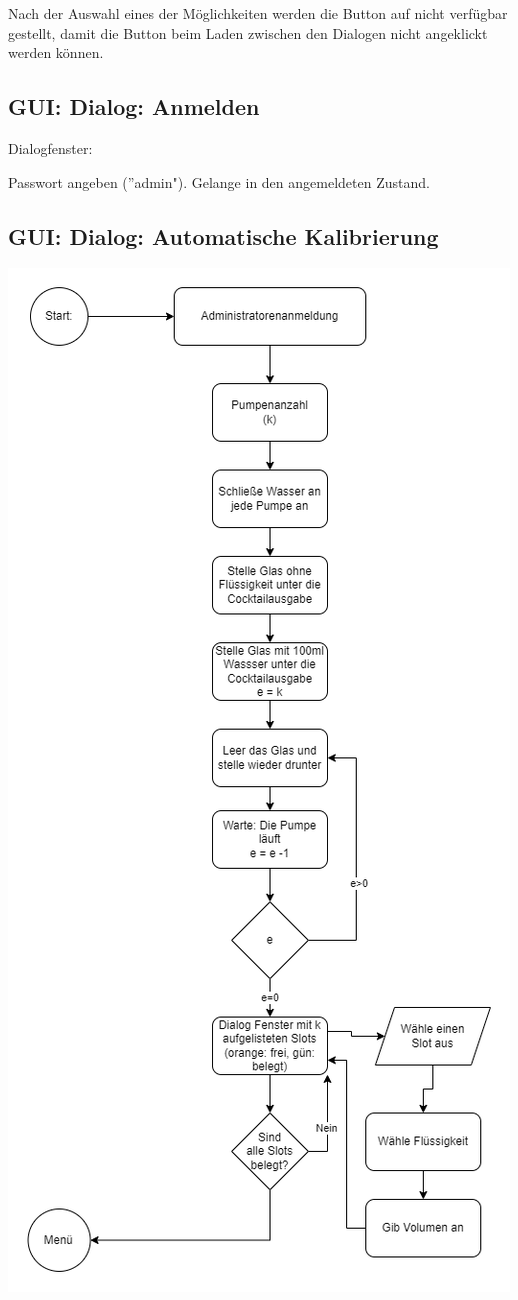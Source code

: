 Nach der Auswahl eines der Möglichkeiten werden die Button auf nicht verfügbar gestellt, damit die Button beim Laden zwischen den Dialogen nicht angeklickt werden können.

\subsection{GUI: Dialog: Anmelden}

Dialogfenster:

Passwort angeben (''admin"). Gelange in den angemeldeten Zustand.

\subsection{GUI: Dialog: Automatische Kalibrierung}
\label{sec:dioautokal}

\includegraphics[scale=0.65]{calibrate.png}

